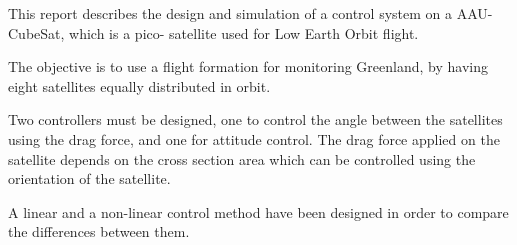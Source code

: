 This report describes the design and simulation of a control system on a AAU-CubeSat, which is a pico- satellite used for Low Earth Orbit flight.

The objective is to use a flight formation for monitoring Greenland, by having eight satellites equally distributed in orbit.

Two controllers must be designed, one to control the angle between the satellites using the drag force, and one for attitude control.  The drag force applied on the satellite depends on the cross section area which can be controlled using the orientation of the satellite.

A linear and a non-linear control method have been designed in order to compare the differences between them.  